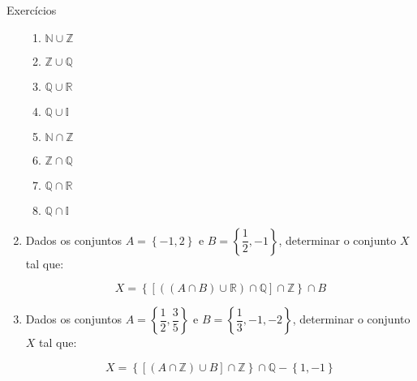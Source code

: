 \documentclass[14pt, aspectratio=169]{beamer}
\newcommand{\R}{\mathbb{R}}
\newcommand{\I}{\mathbb{I}}
\newcommand{\Q}{\mathbb{Q}}
\newcommand{\Z}{\mathbb{Z}}
\newcommand{\N}{\mathbb{N}}
\newcommand{\conj}[1]{\left\{ #1 \right\}}
\begin{document}
\begin{frame}[allowframebreaks]{Exercícios}
\begin{enumerate}
    \begin{multicols}{2}
        \begin{enumerate}[a]
            \item $\N \cup \Z$
            \item $\Z \cup \Q$
            \item $\Q \cup \R$
            \item $\Q \cup \I$
            \item $\N \cap \Z$
            \item $\Z \cap \Q$
            \item $\Q \cap \R$
            \item $\Q \cap \I$
        \end{enumerate}
    \end{multicols}

    \vspace{5.0cm}

    \item Dados os conjuntos $A = \conj{-1, 2}$ e $B = \conj{\dfrac{1}{2}, -1}$, determinar o conjunto $X$ tal que:

    \begin{equation*}
        X = \conj{[((A \cap B) \cup \R) \cap \Q] \cap \Z} \cap B
    \end{equation*}

    \vspace{5.0cm}

    \item Dados os conjuntos $A = \conj{\dfrac{1}{2}, \dfrac{3}{5}}$ e $B = \conj{\dfrac{1}{3}, -1, -2}$, determinar o conjunto $X$ tal que:

    \begin{equation*}
        X = \conj{[(A \cap \Z) \cup B] \cap \Z} \cap \Q - \conj{1, -1}
    \end{equation*}
\end{enumerate}

\end{frame}
\end{document}
